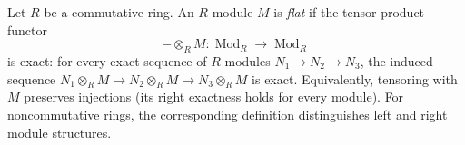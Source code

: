 
Let $R$ be a commutative ring. An $R$-module $M$ is \emph{flat} if the tensor-product functor
\[
-\otimes_R M:\operatorname{Mod}_R\longrightarrow\operatorname{Mod}_R
\]
is exact: for every exact sequence of $R$-modules $N_1\to N_2\to N_3$, the induced sequence $N_1\otimes_R M\to N_2\otimes_R M\to N_3\otimes_R M$ is exact. Equivalently, tensoring with $M$ preserves injections (its right exactness holds for every module). For noncommutative rings, the corresponding definition distinguishes left and right module structures.
